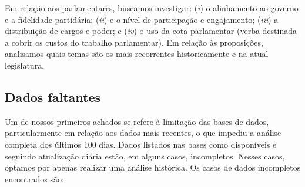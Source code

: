 \documentclass[12pt,a4paper]{article}
\begin{document}
Em relação aos parlamentares, buscamos investigar:
(\emph{i}) o alinhamento ao governo e a fidelidade partidária;
(\emph{ii}) e o nível de participação e engajamento;
(\emph{iii}) a distribuição de cargos e poder;
e (\emph{iv}) o uso da cota parlamentar (verba destinada a cobrir os custos do trabalho parlamentar). 
Em relação às proposições, analisamos quais temas são os mais recorrentes historicamente e na atual legislatura.

\subsection{Dados faltantes}
\label{sec:dados-faltantes}

Um de nossos primeiros achados se refere à limitação das bases de dados, particularmente em relação
aos dados mais recentes, o que impediu a análise completa dos últimos 100 dias. Dados listados
nas bases como disponíveis e seguindo atualização diária estão, em alguns casos, incompletos.
Nesses casos, optamos por apenas realizar uma análise histórica. Os casos de dados incompletos
encontrados são:
\end{document}
